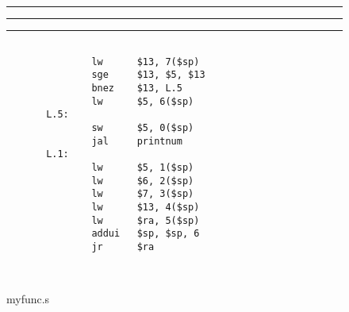 \documentclass[a4paper,10pt]{article}
\begin{document}
\begin{enumerate}
\begin{enumerate}
\begin{figure}[ht]
{\begin{verbatim}
\end{verbatim}   
\vspace{7mm}\hrule\vspace{7mm}\hrule\vspace{7mm}\hrule

\begin{verbatim}
   
               lw      $13, 7($sp)
               sge     $13, $5, $13
               bnez    $13, L.5
               lw      $5, 6($sp)
       L.5:
               sw      $5, 0($sp)
               jal     printnum
       L.1:
               lw      $5, 1($sp)
               lw      $6, 2($sp)
               lw      $7, 3($sp)
               lw      $13, 4($sp)
               lw      $ra, 5($sp)
               addui   $sp, $sp, 6
               jr      $ra

  
\end{verbatim}
}%
\caption{myfunc.s}
\label{fig:c_function_wramp_code-ans}

\end{figure}

\end{enumerate}

\end{enumerate}
\end{document}
